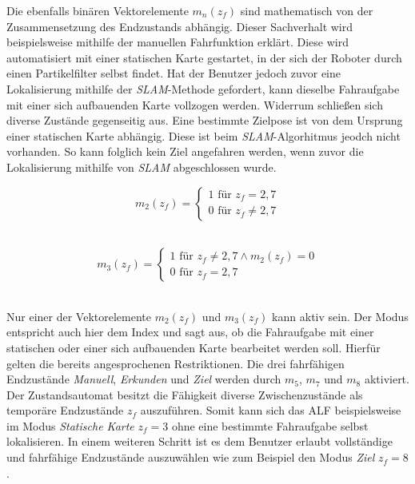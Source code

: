 		Die ebenfalls binären Vektorelemente $m_n(z_f)$ sind mathematisch von der Zusammensetzung des Endzustands abhängig. Dieser Sachverhalt wird beispielsweise mithilfe der manuellen Fahrfunktion erklärt. Diese wird automatisiert mit einer statischen Karte gestartet, in der sich der Roboter durch einen Partikelfilter selbst findet. Hat der Benutzer jedoch zuvor eine Lokalisierung mithilfe der \textit{SLAM}-Methode gefordert, kann dieselbe Fahraufgabe mit einer sich aufbauenden Karte vollzogen werden. Widerrum schließen sich diverse Zustände gegenseitig aus. Eine bestimmte Zielpose ist von dem Ursprung einer statischen Karte abhängig. Diese ist beim \textit{SLAM}-Algorhitmus jeodch nicht vorhanden. So kann folglich kein Ziel angefahren werden, wenn zuvor die Lokalisierung mithilfe von \textit{SLAM} abgeschlossen wurde.\\
		
		\begin{figure}[H]
			\centering
			\begin{minipage}[b]{0.4\textwidth}
				\begin{equation}
					m_2(z_f)=\left\{\begin{array}{ll} 1 \text{ für } z_f=2,7 \\
					0 \text{ für }z_f\neq 2,7\end{array}\right. 
					\label{eq: m2}
				\end{equation}\\
			\end{minipage}
			\hfill
			\begin{minipage}[b]{0.55\textwidth}
				\begin{equation}
					m_3(z_f)=\left\{\begin{array}{ll} 1 \text{ für } z_f\neq2,7 \wedge m_2(z_f) = 0 \\
					0 \text{ für }z_f= 2,7\end{array}\right.
					\label{eq: m3}
				\end{equation}\\
			\end{minipage}
		\end{figure}
		
		Nur einer der Vektorelemente $m_2(z_f)$ und $m_3(z_f)$ kann aktiv sein. Der Modus entspricht auch hier dem Index und sagt aus, ob die Fahraufgabe mit einer statischen oder einer sich aufbauenden Karte bearbeitet werden soll. Hierfür gelten die bereits angesprochenen Restriktionen. Die drei fahrfähigen Endzustände \textit{Manuell}, \textit{Erkunden} und \textit{Ziel} werden durch $m_5$, $m_7$ und $m_8$ aktiviert. Der Zustandsautomat besitzt die Fähigkeit diverse Zwischenzustände als temporäre Endzustände $z_f$ auszuführen. Somit kann sich das ALF beispielsweise im Modus \textit{Statische Karte} $z_f=3$ ohne eine bestimmte Fahraufgabe selbst lokalisieren. In einem weiteren Schritt ist es dem Benutzer erlaubt vollständige und fahrfähige Endzustände auszuwählen wie zum Beispiel den Modus \textit{Ziel} $z_f=8$.\\
		
